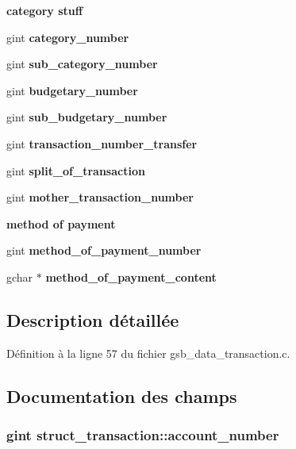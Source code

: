 \begin{Indent}{\bf category stuff}\par
{\em \label{_amgrp5dd09ca295ac645b7efc407c1a87abab}
 }\begin{DoxyCompactItemize}
\item 
gint {\bf category\_\-number}
\item 
gint {\bf sub\_\-category\_\-number}
\item 
gint {\bf budgetary\_\-number}
\item 
gint {\bf sub\_\-budgetary\_\-number}
\item 
gint {\bf transaction\_\-number\_\-transfer}
\item 
gint {\bf split\_\-of\_\-transaction}
\item 
gint {\bf mother\_\-transaction\_\-number}
\end{DoxyCompactItemize}
\end{Indent}
\begin{Indent}{\bf method of payment}\par
{\em \label{_amgrpbbdbbfa765cb9005b09822cb581df3b1}
 }\begin{DoxyCompactItemize}
\item 
gint {\bf method\_\-of\_\-payment\_\-number}
\item 
gchar $\ast$ {\bf method\_\-of\_\-payment\_\-content}
\end{DoxyCompactItemize}
\end{Indent}


\subsection{Description détaillée}


Définition à la ligne 57 du fichier gsb\_\-data\_\-transaction.c.



\subsection{Documentation des champs}
\subsubsection[{account\_\-number}]{\setlength{\rightskip}{0pt plus 5cm}gint {\bf struct\_\-transaction::account\_\-number}}\label{structstruct__transaction_ad59b1d52aaba0418e4a86fcb8d0649a0}


